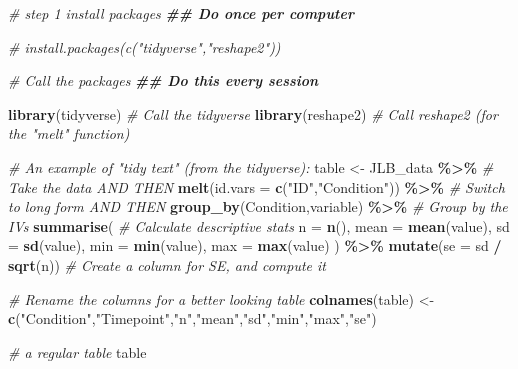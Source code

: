\documentclass[
]{book}
\newenvironment{Shaded}{\begin{snugshade}}{\end{snugshade}}
\newcommand{\AttributeTok}[1]{\textcolor[rgb]{0.13,0.29,0.53}{#1}}
\newcommand{\CommentTok}[1]{\textcolor[rgb]{0.56,0.35,0.01}{\textit{#1}}}
\newcommand{\DocumentationTok}[1]{\textcolor[rgb]{0.56,0.35,0.01}{\textbf{\textit{#1}}}}
\newcommand{\FunctionTok}[1]{\textcolor[rgb]{0.13,0.29,0.53}{\textbf{#1}}}
\newcommand{\NormalTok}[1]{#1}
\newcommand{\OtherTok}[1]{\textcolor[rgb]{0.56,0.35,0.01}{#1}}
\newcommand{\SpecialCharTok}[1]{\textcolor[rgb]{0.81,0.36,0.00}{\textbf{#1}}}
\newcommand{\StringTok}[1]{\textcolor[rgb]{0.31,0.60,0.02}{#1}}
\begin{document}
\begin{Shaded}
\begin{Highlighting}[]
\CommentTok{\# step 1 install packages }
\DocumentationTok{\#\# Do once per computer}

\CommentTok{\# install.packages(c("tidyverse","reshape2"))}

\CommentTok{\# Call the packages }
\DocumentationTok{\#\# Do this every session}

\FunctionTok{library}\NormalTok{(tidyverse) }\CommentTok{\# Call the tidyverse}
\FunctionTok{library}\NormalTok{(reshape2) }\CommentTok{\# Call reshape2 (for the "melt" function)}
\end{Highlighting}
\end{Shaded}

\begin{Shaded}
\begin{Highlighting}[]
\CommentTok{\# An example of "tidy text" (from the tidyverse):}
\NormalTok{table }\OtherTok{\textless{}{-}}\NormalTok{ JLB\_data }\SpecialCharTok{\%\textgreater{}\%} \CommentTok{\# Take the data AND THEN}
  \FunctionTok{melt}\NormalTok{(}\AttributeTok{id.vars =} \FunctionTok{c}\NormalTok{(}\StringTok{"ID"}\NormalTok{,}\StringTok{"Condition"}\NormalTok{)) }\SpecialCharTok{\%\textgreater{}\%} \CommentTok{\# Switch to long form AND THEN}
  \FunctionTok{group\_by}\NormalTok{(Condition,variable) }\SpecialCharTok{\%\textgreater{}\%} \CommentTok{\# Group by the IVs}
  \FunctionTok{summarise}\NormalTok{( }\CommentTok{\# Calculate descriptive stats}
    \AttributeTok{n =} \FunctionTok{n}\NormalTok{(),}
    \AttributeTok{mean =} \FunctionTok{mean}\NormalTok{(value),}
    \AttributeTok{sd =} \FunctionTok{sd}\NormalTok{(value),}
    \AttributeTok{min =} \FunctionTok{min}\NormalTok{(value),}
    \AttributeTok{max =} \FunctionTok{max}\NormalTok{(value)}
\NormalTok{  ) }\SpecialCharTok{\%\textgreater{}\%} \FunctionTok{mutate}\NormalTok{(}\AttributeTok{se =}\NormalTok{ sd }\SpecialCharTok{/} \FunctionTok{sqrt}\NormalTok{(n)) }\CommentTok{\# Create a column for SE, and compute it}

\CommentTok{\# Rename the columns for a better looking table}
\FunctionTok{colnames}\NormalTok{(table) }\OtherTok{\textless{}{-}} \FunctionTok{c}\NormalTok{(}\StringTok{"Condition"}\NormalTok{,}\StringTok{"Timepoint"}\NormalTok{,}\StringTok{"n"}\NormalTok{,}\StringTok{"mean"}\NormalTok{,}\StringTok{"sd"}\NormalTok{,}\StringTok{"min"}\NormalTok{,}\StringTok{"max"}\NormalTok{,}\StringTok{"se"}\NormalTok{)}

\CommentTok{\# a regular table}
\NormalTok{table}
\end{Highlighting}
\end{Shaded}
\end{document}
